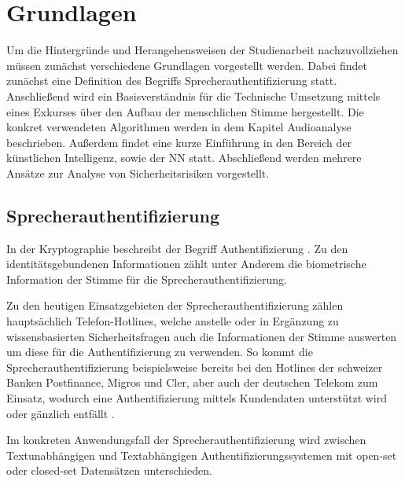 \section{Grundlagen}
Um die Hintergründe und Herangehensweisen der Studienarbeit nachzuvollziehen müssen zunächst verschiedene Grundlagen vorgestellt werden.
Dabei findet zunächst eine Definition des Begriffs Sprecherauthentifizierung statt.
Anschließend wird ein Basisverständnis für die Technische Umsetzung mittels eines Exkurses über den Aufbau der menschlichen Stimme hergestellt.
Die konkret verwendeten Algorithmen werden in dem Kapitel Audioanalyse beschrieben.
Außerdem findet eine kurze Einführung in den Bereich der künstlichen Intelligenz, sowie der \ac{NN} statt.
Abschließend werden mehrere Ansätze zur Analyse von Sicherheitsrisiken vorgestellt.

\subsection{Sprecherauthentifizierung}
In der Kryptographie beschreibt der Begriff Authentifizierung  \autocite[][S. 129]{tsolkas_rollen_2017}.
Zu den identitätsgebundenen Informationen zählt unter Anderem die biometrische Information der Stimme für die Sprecherauthentifizierung.

Zu den heutigen Einsatzgebieten der Sprecherauthentifizierung zählen hauptsächlich Telefon-Hotlines, welche anstelle oder in Ergänzung zu wissensbasierten Sicherheitsfragen auch die Informationen der Stimme auswerten um diese für die Authentifizierung zu verwenden.
So kommt die Sprecherauthentifizierung beispielsweise bereits bei den Hotlines der schweizer Banken Postfinance, Migros und Cler, aber auch der deutschen Telekom zum Einsatz, wodurch eine Authentifizierung mittels Kundendaten unterstützt wird oder gänzlich entfällt \autocite[vgl.][]{anz_mit_2023} \autocite[vgl.][]{noauthor_authentifizierung_nodate} \autocite[vgl.][]{noauthor_meine_nodate}.

Im konkreten Anwendungsfall der Sprecherauthentifizierung wird zwischen Textunabhängigen und Textabhängigen Authentifizierungssystemen mit open-set oder closed-set Datensätzen unterschieden.

